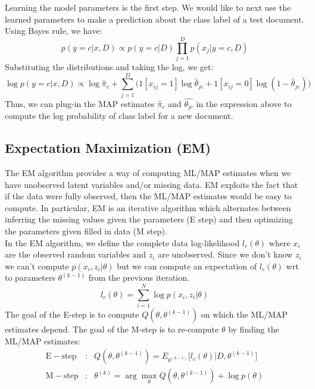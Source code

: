 Learning the model parameters is the first step. We would like to next use the learned parameters to make a prediction about the class label of a test document. Using Bayes rule, we have: 
\begin{equation}
    p(y=c|x, D) \propto p(y=c|D) \prod_{j=1}^{D}p(x_j|y=c, D) 
\end{equation}
Substituting the distributions and taking the log, we get:
\begin{equation}
    \log p(y=c|x, D) \propto \log \hat{\pi}_c + \sum_{j=1}^{D}\bigg(1[x_{ij} = 1]\log \hat{\theta}_{jc} + 1[x_{ij} = 0]\log(1-\hat{\theta}_{jc})\bigg)
\end{equation}
Thus, we can plug-in the MAP estimates $\hat{\pi}_c$ and $\hat{\theta_{jc}}$ in the expression above to compute the log probability of class label for a new document.

\subsection{Expectation Maximization (EM)}

The EM algorithm provides a way of computing ML/MAP estimates when we have unobserved latent variables and/or missing data. EM exploits the fact that if the data were fully observed, then the ML/MAP estimates would be easy to compute. In particular, EM is an iterative algorithm which alternates between inferring the missing values given the parameters (E step) and then optimizing the parameters given filled in data (M step).\\ 

In the EM algorithm, we define the complete data log-likelihood $l_c(\theta)$ where $x_i$ are the observed random variables and $z_i$ are unobserved. Since we don't know $z_i$ we can't compute $p(x_i, z_i|\theta)$ but we can compute an expectation of $l_c(\theta)$ wrt to parameters $\theta^{(k-1)}$ from the previous iteration.  
\begin{equation}
    l_c(\theta) = \sum_{i=1}^{N}\log p(x_i, z_i|\theta) 
\end{equation}
The goal of the E-step is to compute $Q(\theta, \theta^{(k-1)})$ on which the ML/MAP estimates depend. The goal of the M-step is to re-compute $\theta$ by finding the ML/MAP estimates:
\begin{eqnarray}
   \mathrm{E-step} &:& Q(\theta, \theta^{(k-1)}) =  E_{\theta^{(k-1)}}\big[l_c(\theta)|D, \theta^{(k-1)}\big] \\
   \mathrm{M-step} &:& \theta^{(k)} = \arg \max_{\theta}Q(\theta, \theta^{(k-1)}) + \log p(\theta)
\end{eqnarray}

